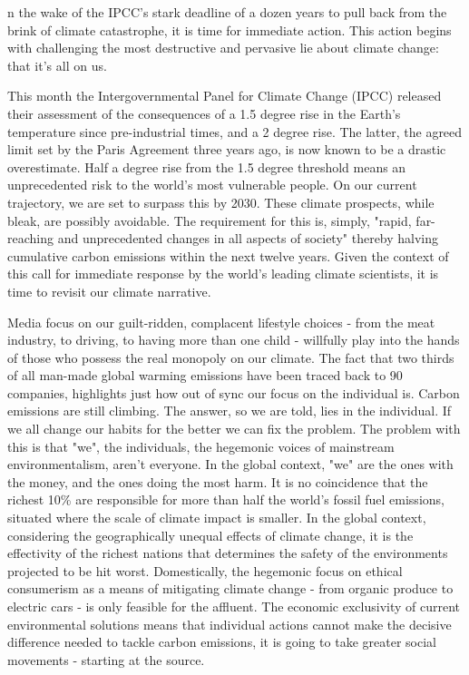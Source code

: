 
n the wake of the IPCC's stark deadline of a dozen years to pull back from
the brink of climate catastrophe, it is time for immediate action. This
action begins with challenging the most destructive and pervasive lie about
climate change: that it's all on us.

   This month the Intergovernmental Panel for Climate Change (IPCC)
   released their assessment of the consequences of a 1.5 degree rise in
   the Earth's temperature since pre-industrial times, and a 2 degree
   rise. The latter, the agreed limit set by the Paris Agreement three
   years ago, is now known to be a drastic overestimate. Half a degree
   rise from the 1.5 degree threshold means an unprecedented risk to the
   world's most vulnerable people. On our current trajectory, we are set
   to surpass this by 2030. These climate prospects, while bleak, are
   possibly avoidable. The requirement for this is, simply, "rapid,
   far-reaching and unprecedented changes in all aspects of society"
   thereby halving cumulative carbon emissions within the next twelve
   years. Given the context of this call for immediate response by the
   world's leading climate scientists, it is time to revisit our climate
   narrative.

   Media focus on our guilt-ridden, complacent lifestyle choices - from
   the meat industry, to driving, to having more than one child -
   willfully play into the hands of those who possess the real monopoly on
   our climate. The fact that two thirds of all man-made global warming
   emissions have been traced back to 90 companies, highlights just how
   out of sync our focus on the individual is. Carbon emissions are still
   climbing. The answer, so we are told, lies in the individual. If we all
   change our habits for the better we can fix the problem. The problem
   with this is that "we", the individuals, the hegemonic voices of
   mainstream environmentalism, aren't everyone. In the global context,
   "we" are the ones with the money, and the ones doing the most harm. It
   is no coincidence that the richest 10\% are responsible for more than
   half the world's fossil fuel emissions, situated where the scale of
   climate impact is smaller. In the global context, considering the
   geographically unequal effects of climate change, it is the effectivity
   of the richest nations that determines the safety of the environments
   projected to be hit worst. Domestically, the hegemonic focus on ethical
   consumerism as a means of mitigating climate change - from organic
   produce to electric cars - is only feasible for the affluent. The
   economic exclusivity of current environmental solutions means that
   individual actions cannot make the decisive difference needed to tackle
   carbon emissions, it is going to take greater social movements -
   starting at the source.

